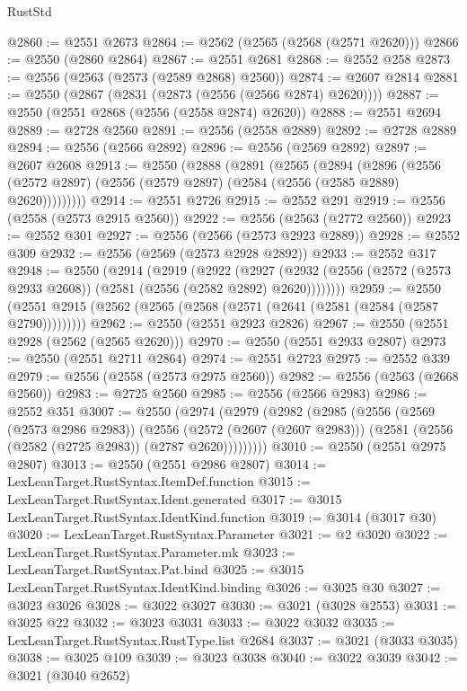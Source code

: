 \begin{lexlean}{RustStd}
\begin{coremodule}
@2860 := @2551 @2673
@2864 := @2562 (@2565 (@2568 (@2571 @2620)))
@2866 := @2550 (@2860 @2864)
@2867 := @2551 @2681
@2868 := @2552 @258
@2873 := @2556 (@2563 (@2573 (@2589 @2868) @2560))
@2874 := @2607 @2814
@2881 := @2550 (@2867 (@2831 (@2873 (@2556 (@2566 @2874) @2620))))
@2887 := @2550 (@2551 @2868 (@2556 (@2558 @2874) @2620))
@2888 := @2551 @2694
@2889 := @2728 @2560
@2891 := @2556 (@2558 @2889)
@2892 := @2728 @2889
@2894 := @2556 (@2566 @2892)
@2896 := @2556 (@2569 @2892)
@2897 := @2607 @2608
@2913 := @2550
    (@2888
      (@2891
        (@2565
          (@2894
            (@2896
              (@2556 (@2572 @2897) (@2556 (@2579 @2897) (@2584 (@2556 (@2585 @2889) @2620)))))))))
@2914 := @2551 @2726
@2915 := @2552 @291
@2919 := @2556 (@2558 (@2573 @2915 @2560))
@2922 := @2556 (@2563 (@2772 @2560))
@2923 := @2552 @301
@2927 := @2556 (@2566 (@2573 @2923 @2889))
@2928 := @2552 @309
@2932 := @2556 (@2569 (@2573 @2928 @2892))
@2933 := @2552 @317
@2948 := @2550
    (@2914
      (@2919
        (@2922
          (@2927 (@2932 (@2556 (@2572 (@2573 @2933 @2608)) (@2581 (@2556 (@2582 @2892) @2620))))))))
@2959 := @2550 (@2551 @2915 (@2562 (@2565 (@2568 (@2571 (@2641 (@2581 (@2584 (@2587 @2790)))))))))
@2962 := @2550 (@2551 @2923 @2826)
@2967 := @2550 (@2551 @2928 (@2562 (@2565 @2620)))
@2970 := @2550 (@2551 @2933 @2807)
@2973 := @2550 (@2551 @2711 @2864)
@2974 := @2551 @2723
@2975 := @2552 @339
@2979 := @2556 (@2558 (@2573 @2975 @2560))
@2982 := @2556 (@2563 (@2668 @2560))
@2983 := @2725 @2560
@2985 := @2556 (@2566 @2983)
@2986 := @2552 @351
@3007 := @2550
    (@2974
      (@2979
        (@2982
          (@2985
            (@2556
              (@2569 (@2573 @2986 @2983))
              (@2556
                (@2572 (@2607 (@2607 @2983)))
                (@2581 (@2556 (@2582 (@2725 @2983)) (@2787 @2620)))))))))
@3010 := @2550 (@2551 @2975 @2807)
@3013 := @2550 (@2551 @2986 @2807)
@3014 := LexLeanTarget.RustSyntax.ItemDef.function
@3015 := LexLeanTarget.RustSyntax.Ident.generated
@3017 := @3015 LexLeanTarget.RustSyntax.IdentKind.function
@3019 := @3014 (@3017 @30)
@3020 := LexLeanTarget.RustSyntax.Parameter
@3021 := @2 @3020
@3022 := LexLeanTarget.RustSyntax.Parameter.mk
@3023 := LexLeanTarget.RustSyntax.Pat.bind
@3025 := @3015 LexLeanTarget.RustSyntax.IdentKind.binding
@3026 := @3025 @30
@3027 := @3023 @3026
@3028 := @3022 @3027
@3030 := @3021 (@3028 @2553)
@3031 := @3025 @22
@3032 := @3023 @3031
@3033 := @3022 @3032
@3035 := LexLeanTarget.RustSyntax.RustType.list @2684
@3037 := @3021 (@3033 @3035)
@3038 := @3025 @109
@3039 := @3023 @3038
@3040 := @3022 @3039
@3042 := @3021 (@3040 @2652)

\end{coremodule}
\end{lexlean}
